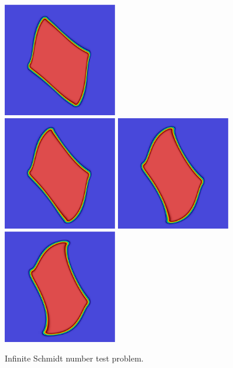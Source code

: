 \documentclass[final]{siamltex}
\begin{document}
\begin{figure}
\begin{center}
\includegraphics[width=1.95in]{square_6}\\
\includegraphics[width=1.95in]{square_7}
\includegraphics[width=1.95in]{square_8}
\includegraphics[width=1.95in]{square_9}\\
\caption{Infinite Schmidt number test problem.}
\end{center}
\end{figure}



\end{document}

